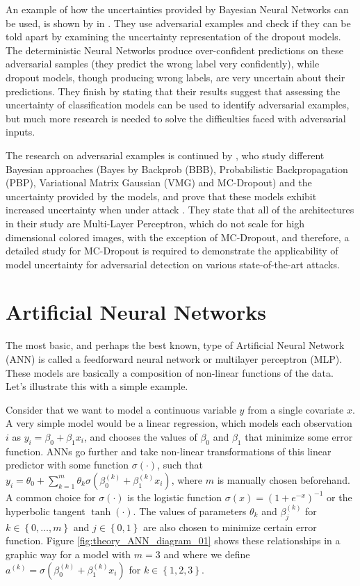 An example of how the uncertainties provided by Bayesian Neural Networks can be used, is shown by \citeauthor{li2017dropout} in \cite{li2017dropout}. They use adversarial examples and check if they can be told apart by examining the uncertainty representation of the dropout models. The deterministic Neural Networks produce over-confident predictions on these adversarial samples (they predict the wrong label very confidently), while dropout models, though producing wrong labels, are very uncertain about their predictions. They finish by stating that their results suggest that assessing the uncertainty of classification models can be used to identify adversarial examples, but much more research is needed to solve the difficulties faced with adversarial inputs.

The research on adversarial examples is continued by \citeauthor{rawat2017adversarial}, who study different Bayesian approaches (Bayes by Backprob (BBB), Probabilistic Backpropagation (PBP), Variational Matrix Gaussian (VMG) and MC-Dropout) and the uncertainty provided by the models, and prove that these models exhibit increased uncertainty when under attack \cite{rawat2017adversarial}. They state that all of the architectures in their study are Multi-Layer Perceptron, which do not scale for high dimensional colored images, with the exception of MC-Dropout, and therefore, a detailed study for MC-Dropout is required to demonstrate the applicability of model uncertainty for adversarial detection on various state-of-the-art attacks.

\section{Artificial Neural Networks}

The most basic, and perhaps the best known, type of Artificial Neural Network (ANN) is called a feedforward neural network or multilayer perceptron (MLP). These models are basically a composition of non-linear functions of the data. Let's illustrate this with a simple example.

Consider that we want to model a continuous variable $y$ from a single covariate $x$. A very simple model would be a linear regression, which models each observation $i$ as $y_i = \beta_0 + \beta_1 x_i$, and chooses the values of $\beta_0$ and $\beta_1$ that minimize some error function. ANNs go further and take non-linear transformations of this linear predictor with some function $\sigma(\cdot)$, such that $y_i = \theta_0 +  \sum_{k = 1}^m \theta_k \sigma \left( \beta_0^{(k)} + \beta_1^{(k)} x_i \right)$, where $m$ is manually chosen beforehand. A common choice for $\sigma(\cdot)$
is the logistic function $\sigma(x) = (1 + e^{-x})^{-1}$
or the hyperbolic tangent $\tanh(\cdot)$. The values of parameters $\theta_k$ and $\beta_j^{(k)}$ for $k \in \left\{ 0, \ldots, m \right\}$ and $j \in \left\{ 0, 1 \right\}$ are also chosen to minimize certain error function. Figure \ref{fig:theory_ANN_diagram_01} shows these relationships in a graphic way for a model with $m = 3$ and where we define $a^{(k)} = \sigma \left( \beta_0^{(k)} + \beta_1^{(k)} x_i \right)$ for $k \in \left\{ 1, 2, 3 \right\}$.

